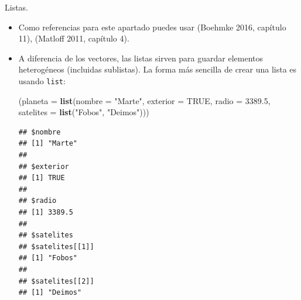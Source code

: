 \documentclass[
  9pt,
  ignorenonframetext,
]{beamer}
\newenvironment{Shaded}{\begin{snugshade}}{\end{snugshade}}
\newcommand{\DataTypeTok}[1]{\textcolor[rgb]{0.13,0.29,0.53}{#1}}
\newcommand{\FloatTok}[1]{\textcolor[rgb]{0.00,0.00,0.81}{#1}}
\newcommand{\KeywordTok}[1]{\textcolor[rgb]{0.13,0.29,0.53}{\textbf{#1}}}
\newcommand{\NormalTok}[1]{#1}
\newcommand{\OtherTok}[1]{\textcolor[rgb]{0.56,0.35,0.01}{#1}}
\newcommand{\StringTok}[1]{\textcolor[rgb]{0.31,0.60,0.02}{#1}}
\begin{document}
\begin{frame}[fragile]{Listas.}
\protect\hypertarget{listas.}{}

\begin{itemize}
\item
  Como referencias para este apartado puedes usar (Boehmke 2016,
  capítulo 11), (Matloff 2011, capítulo 4).
\item
  A diferencia de los vectores, las listas sirven para guardar elementos
  heterogéneos (incluidas sublistas). La forma más sencilla de crear una
  lista es usando \texttt{list}:\small

\begin{Shaded}
\begin{Highlighting}[]
\NormalTok{(}\DataTypeTok{planeta =} \KeywordTok{list}\NormalTok{(}\DataTypeTok{nombre =} \StringTok{"Marte"}\NormalTok{, }\DataTypeTok{exterior =} \OtherTok{TRUE}\NormalTok{, }
                 \DataTypeTok{radio =} \FloatTok{3389.5}\NormalTok{, }\DataTypeTok{satelites =} \KeywordTok{list}\NormalTok{(}\StringTok{"Fobos"}\NormalTok{, }\StringTok{"Deimos"}\NormalTok{)))}
\end{Highlighting}
\end{Shaded}

\begin{verbatim}
## $nombre
## [1] "Marte"
## 
## $exterior
## [1] TRUE
## 
## $radio
## [1] 3389.5
## 
## $satelites
## $satelites[[1]]
## [1] "Fobos"
## 
## $satelites[[2]]
## [1] "Deimos"
\end{verbatim}

  \normalsize
\end{itemize}

\end{frame}
\end{document}
